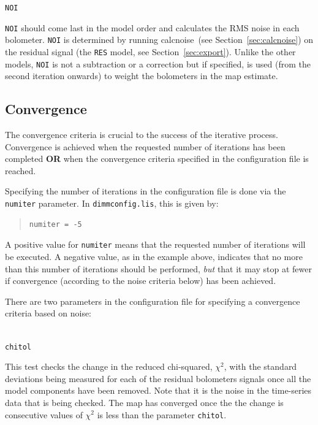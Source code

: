 \documentclass[twoside,11pt]{article}
\newcommand{\xref}[3]{#1}
\newcommand{\xlabel}[1]{}
\renewcommand{\_}{\texttt{\symbol{95}}}
\newenvironment{myquote}{\begin{quote}\begin{small}}{\end{small}\end{quote}}
\newcommand{\task}[1]{\textsf{#1}}
\newcommand{\calcnoise}{\xref{\task{calcnoise}}{sun258}{CALCNOISE}}
\begin{document}
\begin{minipage}[t]{0.07\linewidth}
\texttt{NOI}
\end{minipage}
\begin{minipage}[t]{0.92\linewidth}\texttt{NOI} should come last in the model
order and calculates the RMS noise in each bolometer.  \texttt{NOI} is
determined by running \calcnoise\ (see Section~\ref{sec:calcnoise}) on
the residual signal (the \texttt{RES} model, see
Section~\ref{sec:export}).  Unlike the other models, \texttt{NOI} is
not a subtraction or a correction but if specified, is used (from the
second iteration onwards) to weight the bolometers in the map
estimate.
\end{minipage}

\subsection{\xlabel{convergence}Convergence}
\label{sec:converge}

The convergence criteria is crucial to the success of the iterative
process. Convergence is achieved when the requested number of
iterations has been completed \textbf{OR} when the convergence
criteria specified in the configuration file is reached.

Specifying the number of iterations in the configuration file is done via
the \texttt{numiter} parameter. In \texttt{dimmconfig.lis}, this is given
by:
\vspace{-0.1cm}
\begin{myquote}
\begin{verbatim}
numiter = -5
\end{verbatim}
\end{myquote}
\vspace{-0.2cm}
A positive value for \texttt{numiter} means that the requested number
of iterations will be executed. A negative value, as in the example
above, indicates that no more than this number of iterations should be
performed, \emph{but} that it may stop at fewer if convergence
(according to the noise criteria below) has been achieved.

There are two parameters in the configuration file for specifying a
convergence criteria based on noise:
\\ \\
\begin{minipage}[t]{0.1\linewidth}
\texttt{chitol}
\end{minipage}
\begin{minipage}[t]{0.9\linewidth}This test checks the change in the
reduced chi-squared, $\chi^2$, with the standard deviations being
measured for each of the residual bolometers signals once all the
model components have been removed. Note that it is the noise in the
time-series data that is being checked. The map has converged once the
the change is consecutive values of $\chi^2$ is less than the
parameter \texttt{chitol}.
\end{minipage}
\vspace{2mm}
\end{document}
